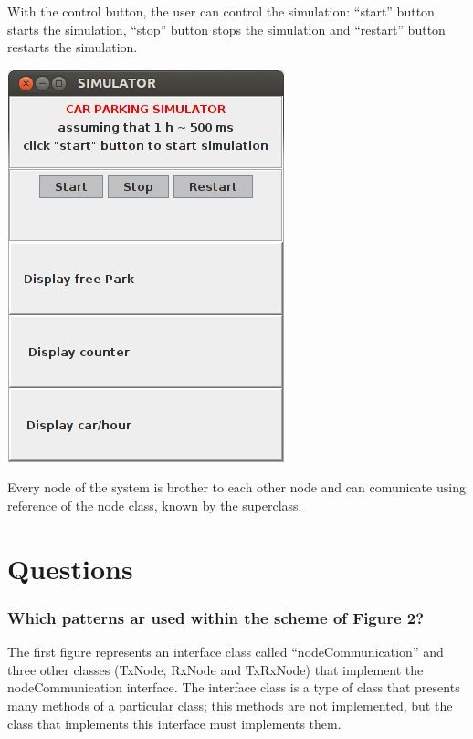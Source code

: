 \documentclass[a4paper,titlepage]{article}
\begin{document}
With the control button, the user can control the simulation: ``start'' button starts the simulation, ``stop'' button stops the simulation and ``restart'' button restarts the simulation.

    \begin{center}

    \centering
    \includegraphics[scale=0.50]{interface.png}

    \end{center}

Every node of the system is brother to each other node and can comunicate using reference of the node class, known by the superclass.


\newpage
\part{Questions}

\section{ Which patterns ar used within the scheme of Figure 2?}

The first figure represents an interface class called ``nodeCommunication'' and three other classes (TxNode, RxNode and TxRxNode) that implement the nodeCommunication interface. The interface class is a type of class that presents many methods of a particular class; this methods are not implemented, but the class that implements this interface must implements them.
\end{document}
